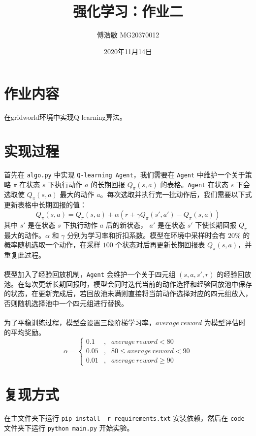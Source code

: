 \documentclass[a4paper,12pt]{article}
\begin{document}
\begin{CJK}{UTF8}{gbsn}

\title{强化学习：作业二}

\author{傅浩敏 MG20370012}

\date{2020年11月14日}

\maketitle

\section{作业内容}
在gridworld环境中实现Q-learning算法。

\section{实现过程}
首先在 \texttt{algo.py} 中实现 \texttt{Q-learning Agent}，我们需要在 \texttt{Agent} 中维护一个关于策略 $\pi$ 在状态 $s$ 下执行动作 $a$ 的长期回报 $Q_\pi(s,a)$ 的表格。\texttt{Agent} 在状态 $s$ 下会选取使 $Q_\pi(s,a)$ 最大的动作 $a$。每次选取并执行完一批动作后，我们需要以下式更新表格中长期回报的值：
$$Q_\pi(s,a)=Q_\pi(s,a)+\alpha(r+\gamma Q_\pi(s',a')-Q_\pi(s,a))$$
其中 $s'$ 是在状态 $s$ 下执行动作 $a$ 后的新状态， $a'$ 是在状态 $s'$ 下使长期回报 $Q_\pi$ 最大的动作。$\alpha$ 和 $\gamma$ 分别为学习率和折扣系数。模型在环境中采样时会有 $20\%$ 的概率随机选取一个动作，在采样 $100$ 个状态对后再更新长期回报表 $Q_\pi(s,a)$，并重复此过程。\\\\
模型加入了经验回放机制，\texttt{Agent} 会维护一个关于四元组 $(s,a,s',r)$ 的经验回放池。在每次更新长期回报时，模型会同时迭代当前的动作选择和经验回放池中保存的状态，在更新完成后，若回放池未满则直接将当前动作选择对应的四元组放入，否则随机选择池中一个四元组进行替换。\\\\
为了平稳训练过程，模型会设置三段阶梯学习率，$average\ reword$ 为模型评估时的平均奖励。
$$\alpha=\left\{\begin{aligned}
0.1 &,& average\ reword<80 \\
0.05 &,& 80\leq average\ reword<90 \\
0.01 &,& average\ reword\geq 90
\end{aligned}\right.$$
\section{复现方式}
在主文件夹下运行 \texttt{pip install -r requirements.txt} 安装依赖，然后在 \texttt{code} 文件夹下运行 \texttt{python main.py} 开始实验。

\end{CJK}
\end{document}
